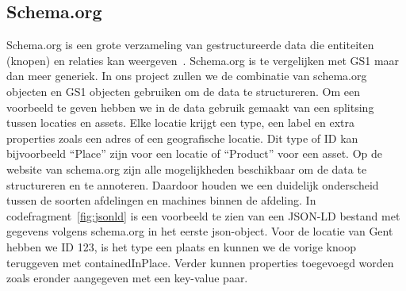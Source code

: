 \subsection{Schema.org}
Schema.org is een grote verzameling van gestructureerde data die entiteiten (knopen) en relaties kan weergeven~\autocite{Douglas2023}.
Schema.org is te vergelijken met GS1 maar dan meer generiek. In ons project zullen we de combinatie van schema.org objecten en GS1 objecten gebruiken om de data te structureren.
Om een voorbeeld te geven hebben we in de data gebruik gemaakt van een splitsing tussen locaties en assets.
Elke locatie krijgt een type, een label en extra properties zoals een adres of een geografische locatie.
Dit type of ID kan bijvoorbeeld ``Place'' zijn voor een locatie of ``Product'' voor een asset. 
Op de website van schema.org zijn alle mogelijkheden beschikbaar om de data te structureren en te annoteren.
Daardoor houden we een duidelijk onderscheid tussen de soorten afdelingen en machines binnen de afdeling.
In codefragment~\ref{fig:jsonld} is een voorbeeld te zien van een JSON-LD bestand met gegevens volgens schema.org in het eerste json-object.
Voor de locatie van Gent hebben we ID 123, is het type een plaats en kunnen we de vorige knoop teruggeven met containedInPlace.
Verder kunnen properties toegevoegd worden zoals eronder aangegeven met een key-value paar.
